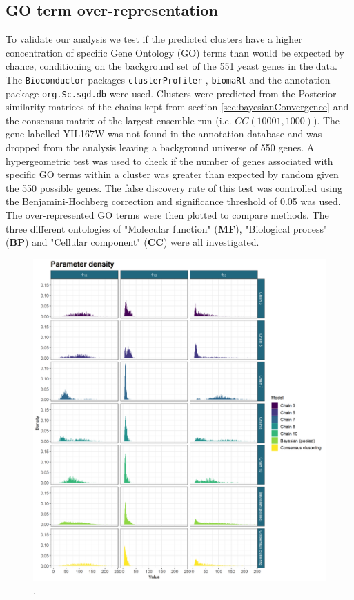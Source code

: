 \documentclass[]{article}
\begin{document}
\subsection{GO term over-representation} \label{sec:goTermOverRep}
To validate our analysis we test if the predicted clusters have a higher concentration of specific  Gene Ontology (GO) terms than would be expected by chance, conditioning on the background set of the 551 yeast genes in the data. The \texttt{Bioconductor} packages \texttt{clusterProfiler} \citep{yu2012clusterProfiler}, \texttt{biomaRt} \citep{durinck2009mapping} and the annotation package \texttt{org.Sc.sgd.db} \citep{carlson2014org} were used. Clusters were predicted from the Posterior similarity matrices of the chains kept from section \ref{sec:bayesianConvergence} and the consensus matrix of the largest ensemble run (i.e. $CC(10001, 1000)$). The gene labelled YIL167W was not found in the annotation database and was dropped from the analysis leaving a background universe of 550 genes. A hypergeometric test was used to check if the number of genes associated with specific GO terms within a cluster was greater than expected by random given the 550 possible genes. The false discovery rate of this test was controlled using the Benjamini-Hochberg correction \citep{benjamini1995controlling} and significance threshold of 0.05 was used. The over-represented GO terms were then plotted to compare methods. The three different ontologies of "Molecular function" (\textbf{MF}), "Biological process" (\textbf{BP}) and "Cellular component" (\textbf{CC}) were all investigated.

\begin{figure}
	\centering
	\includegraphics[scale=0.6]{../Images/Yeast/ComparisonDensities.png}
	\caption{.}
	\label{fig:yeastGOMF}
\end{figure}



%

  
\end{document}
